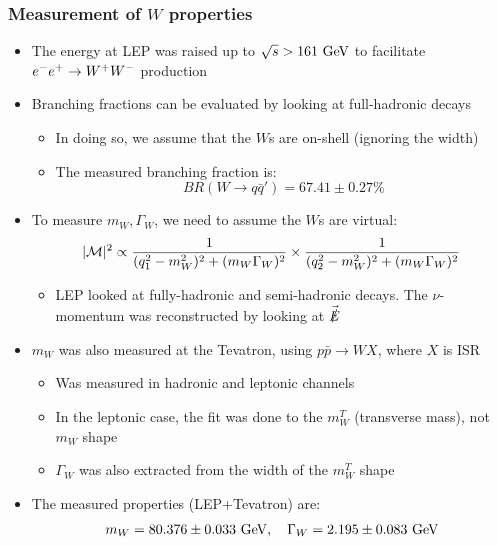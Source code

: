 \subsubsection{Measurement of $W$ properties}
\begin{itemize}
  \item The energy at LEP was raised up to $\sqrt s > 161~\text{GeV}$ to facilitate $e^{-}e^{+} \rightarrow W^+W^-$ production
  \item Branching fractions can be evaluated by looking at full-hadronic decays
  \begin{itemize}
    \item In doing so, we assume that the $W$s are on-shell (ignoring the width)
    \item The measured branching fraction is:
    \begin{equation}
      BR(W\rightarrow q\bar q') = 67.41 \pm 0.27\%
    \end{equation}
  \end{itemize}
  \item To measure $m_W,\Gamma_W$, we need to assume the $W$s are virtual:
  \begin{equation}
    |\mathcal{M}|^2 \propto \frac{1}{(q_1^2-m_W^2)^2+(m_W\Gamma_W)^2}\times\frac{1}{(q_2^2-m_W^2)^2+(m_W\Gamma_W)^2}
  \end{equation}
  \begin{itemize}
    \item LEP looked at fully-hadronic and semi-hadronic decays. The $\nu$-momentum was reconstructed by looking at $\vec{ \slashed E}$
  \end{itemize}
  \item $m_W$ was also measured at the Tevatron, using $p \bar p \rightarrow WX$, where $X$ is ISR
  \begin{itemize}
    \item Was measured in hadronic and leptonic channels
    \item In the leptonic case, the fit was done to the $m_W^T$ (transverse mass), not $m_W$ shape
    \item $\Gamma_W$ was also extracted from the width of the $m_W^T$ shape
  \end{itemize}
  \item The measured properties (LEP+Tevatron) are:
  \begin{equation}
    m_W = 80.376 \pm 0.033~\text{GeV}, \quad \Gamma_W = 2.195 \pm 0.083~\text{GeV}
  \end{equation}
\end{itemize}


